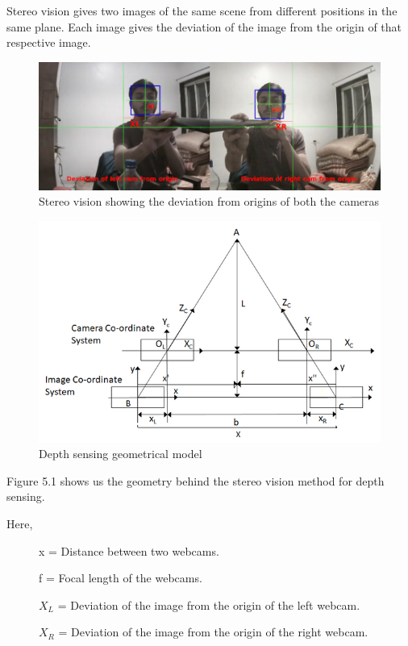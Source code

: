 \documentclass[twocolumn]{report}
\begin{document}
Stereo vision gives two images of the same scene from different positions in the same 
plane. Each image gives the deviation of the image from the origin of that respective 
image.

\begin{figure}
    \centering
    \includegraphics[width=\textwidth]{stereo_vision_pixel_xl_xr.png}
    \caption{Stereo vision showing the deviation from origins of both the cameras}
\end{figure}

\FloatBarrier

\begin{figure}[ht]
    \centering
    \includegraphics[width=\columnwidth]{stereo_vision_geometry.png}
    \caption{Depth sensing geometrical model}
\end{figure}

\FloatBarrier

Figure 5.1 shows us the geometry behind the stereo vision method for depth sensing.

Here, 

\begin{description}
    \item[]x = Distance between two webcams. 
    \item[]f = Focal length of the webcams.
    \item[]\(X_{L}\) = Deviation of the image from the origin of the left webcam.
    \item[]\(X_{R}\) = Deviation of the image from the origin of the right webcam.  
\end{description}
\end{document}
